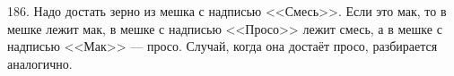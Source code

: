 186. Надо достать зерно из мешка с надписью <<Смесь>>. Если это мак, то в мешке лежит мак, в мешке с надписью <<Просо>> лежит смесь, а в мешке с надписью <<Мак>> --- просо. Случай, когда она достаёт просо, разбирается аналогично.\\
